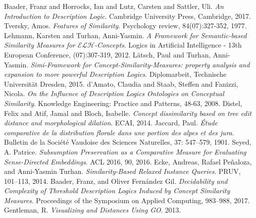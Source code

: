 \documentclass[]{llncs}
\newcommand{\elh}{\(\mathcal{ELH}{}\)}
\begin{document}
  \begin{thebibliography}{1}
      Baader, Franz and Horrocks, Ian and Lutz, Carsten and Sattler, Uli.
      \textit{An Introduction to Description Logic}.
      Cambridge University Press, Cambridge, 2017.
      Tversky, Amos.
      \textit{Features of Similarity}.
      Psychology review, 84(07):327-352, 1977.
      Lehmann, Karsten and Turhan, Anni-Yasmin.
      \textit{A Framework for Semantic-based Similarity Measures for \elh-Concepts}.
      Logics in Artificial Intelligence - 13th European Conference, (07):307-319, 2012.
      Lätsch, Paul and Turhan, Anni-Yasmin.
      \textit{Simi-Framework for Concept-Similarity-Measures: property analysis and expansion to more powerful Description Logics}.
      Diplomarbeit, Technische Universität Dresden, 2015.
      d’Amato, Claudia and Staab, Steffen and Fanizzi, Nicola.
      \textit{On the Influence of Description Logics Ontologies on Conceptual Similarity}.
      Knowledge Engineering: Practice and Patterns, 48-63, 2008.
      Distel, Felix and Atif, Jamal and Bloch, Isabelle.
      \textit{Concept dissimilarity based on tree edit  distance and morphological dilation}.
      ECAI, 2014.
      Jaccard, Paul.
      \textit{\'Etude comparative de la distribution florale dans une portion des alpes et des jura}.
      Bulletin de la Société Vaudoise des Sciences Naturelles, 37: 547–579, 1901.
      Seyed, A. Patrice.
      \textit{Subsumption Preservation as a Comparative Measure for Evaluating Sense-Directed Embeddings}.
      ACL 2016, 90, 2016.
    Ecke, Andreas, Rafael Peñaloza, and Anni-Yasmin Turhan.
    \textit{Similarity-Based Relaxed Instance Queries}.
    PRUV, 101–113, 2014.
    Baader, Franz, and Oliver Fernández Gil.
    \textit{Decidability and Complexity of Threshold Description Logics Induced by Concept Similarity Measures}.
    Proceedings of the Symposium on Applied Computing, 983–988, 2017.
    Gentleman, R.
    \textit{Visualizing and Distances Using GO}.
    2013.%
  \end{thebibliography}
\end{document}
